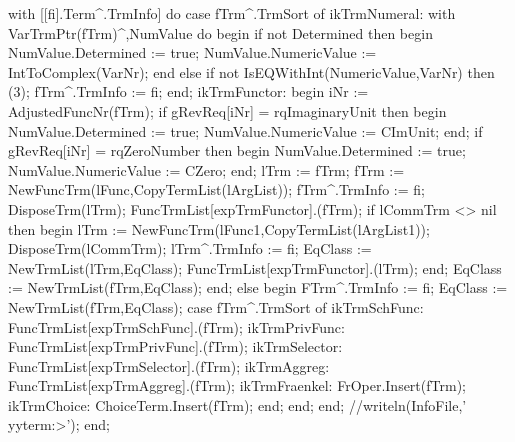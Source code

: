    with [[fi].Term^.TrmInfo] do
      case fTrm^.TrmSort of
        ikTrmNumeral:
           with VarTrmPtr(fTrm)^,NumValue do
           begin
              if not Determined then
              begin
                 NumValue.Determined := true;
                 NumValue.NumericValue := IntToComplex(VarNr);
              end
              else if not IsEQWithInt(NumericValue,VarNr) then
                 (3);
              fTrm^.TrmInfo := fi;
           end;
        ikTrmFunctor:
           begin
              iNr := AdjustedFuncNr(fTrm);
              if gRevReq[iNr] = rqImaginaryUnit then
              begin
                 NumValue.Determined := true;
                 NumValue.NumericValue := CImUnit;
              end;
              if gRevReq[iNr] = rqZeroNumber then
              begin
                 NumValue.Determined := true;
                 NumValue.NumericValue := CZero;
              end;
              lTrm := fTrm;
              fTrm := NewFuncTrm(lFunc,CopyTermList(lArgList));
              fTrm^.TrmInfo := fi;
              DisposeTrm(lTrm);
              FuncTrmList[expTrmFunctor].(fTrm);
              if lCommTrm <> nil then
              begin
                 lTrm := NewFuncTrm(lFunc1,CopyTermList(lArgList1));
                 DisposeTrm(lCommTrm);
                 lTrm^.TrmInfo := fi;
                 EqClass := NewTrmList(lTrm,EqClass);
                 FuncTrmList[expTrmFunctor].(lTrm);
              end;
              EqClass := NewTrmList(fTrm,EqClass);
           end;
      else
      begin
         FTrm^.TrmInfo := fi;
         EqClass := NewTrmList(fTrm,EqClass);
         case fTrm^.TrmSort of
           ikTrmSchFunc: FuncTrmList[expTrmSchFunc].(fTrm);
           ikTrmPrivFunc: FuncTrmList[expTrmPrivFunc].(fTrm);
           ikTrmSelector: FuncTrmList[expTrmSelector].(fTrm);
           ikTrmAggreg: FuncTrmList[expTrmAggreg].(fTrm);
           ikTrmFraenkel: FrOper.Insert(fTrm);
           ikTrmChoice: ChoiceTerm.Insert(fTrm);
         end;
      end;
      end;
   //writeln(InfoFile,' yyterm:>');
end;
\eatline
